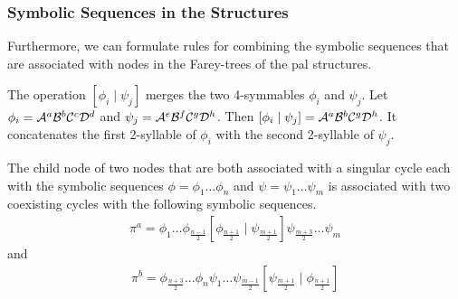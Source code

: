 \subsubsection{Symbolic Sequences in the  Structures}

Furthermore, we can formulate rules for combining the symbolic sequences that are associated with nodes in the Farey-trees of the \gls{pal} structures.

\begin{definition}
	The operation $\left[\phi_i \mid \psi_j\right]$ merges the two 4-symmables $\phi_i$ and $\psi_j$.
	Let $\phi_i = \mathcal{A}^a\mathcal{B}^b\mathcal{C}^c\mathcal{D}^d$ and $\psi_j = \mathcal{A}^e\mathcal{B}^f\mathcal{C}^g\mathcal{D}^h$.
	Then $\left[\phi_i \mid \psi_j\right] = \mathcal{A}^a\mathcal{B}^b\mathcal{C}^g\mathcal{D}^h$.
	It concatenates the first 2-syllable of $\phi_i$ with the second 2-syllable of $\psi_j$.
\end{definition}

\begin{theorem}
	\label{theorem:child.symbolic.1}
	The child node of two nodes that are both associated with a singular cycle each with the symbolic sequences $\phi = \phi_1 \dots \phi_n$ and $\psi = \psi_1 \dots \psi_m$ is associated with two coexisting cycles with the following symbolic sequences.
	\begin{align}
		\pi^a = \phi_1 \dots \phi_{\frac{n-1}{2}} \left[\phi_{\frac{n+1}{2}} \mid \psi_{\frac{m+1}{2}}\right] \psi_{\frac{m+3}{2}} \dots \psi_m
	\end{align}
	and
	\begin{align}
		\pi^b = \phi_{\frac{n+3}{2}} \dots \phi_n \psi_1 \dots \psi_{\frac{m-1}{2}} \left[\psi_{\frac{m+1}{2}} \mid \phi_{\frac{n+1}{2}}\right]
	\end{align}
\end{theorem}

